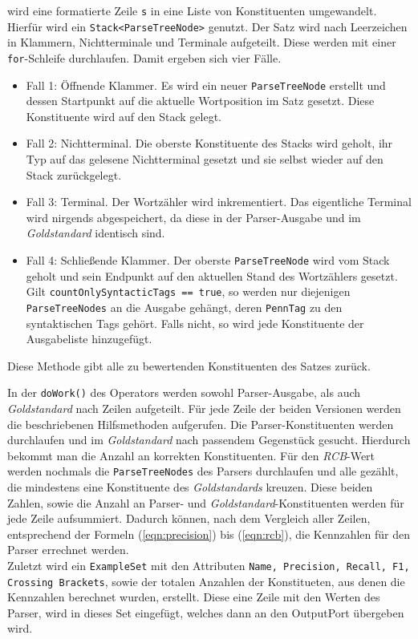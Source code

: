 wird eine formatierte Zeile \texttt{s} in eine Liste von Konstituenten umgewandelt. Hierfür wird ein \texttt{Stack<ParseTreeNode>} genutzt. Der Satz wird nach Leerzeichen in Klammern, Nichtterminale und Terminale aufgeteilt. Diese werden mit einer \texttt{for}-Schleife durchlaufen. Damit ergeben sich vier Fälle. 
\begin{itemize}
\item Fall 1: Öffnende Klammer. Es wird ein neuer \texttt{ParseTreeNode} erstellt und dessen Startpunkt auf die aktuelle Wortposition im Satz gesetzt. Diese Konstituente wird auf den Stack gelegt.
\item Fall 2: Nichtterminal. Die oberste Konstituente des Stacks wird geholt, ihr Typ auf das gelesene Nichtterminal gesetzt und sie selbst wieder auf den Stack zurückgelegt.
\item Fall 3: Terminal. Der Wortzähler wird inkrementiert. Das eigentliche Terminal wird nirgends abgespeichert, da diese in der Parser-Ausgabe und im \textit{Goldstandard} identisch sind. 
\item Fall 4: Schließende Klammer. Der oberste \texttt{ParseTreeNode} wird vom Stack geholt und sein Endpunkt auf den aktuellen Stand des Wortzählers gesetzt. Gilt \texttt{countOnlySyntacticTags == true}, so werden nur diejenigen \texttt{ParseTreeNodes} an die Ausgabe gehängt, deren \texttt{PennTag} zu den syntaktischen Tags gehört. Falls nicht, so wird jede Konstituente der Ausgabeliste hinzugefügt.
\end{itemize}
Diese Methode gibt alle zu bewertenden Konstituenten des Satzes zurück. 

In der \texttt{doWork()} des Operators werden sowohl Parser-Ausgabe, als auch \textit{Goldstandard} nach Zeilen aufgeteilt. Für jede Zeile der beiden Versionen werden die beschriebenen Hilfsmethoden aufgerufen. Die Parser-Konstituenten werden durchlaufen und im \textit{Goldstandard} nach passendem Gegenstück gesucht. Hierdurch bekommt man die Anzahl an korrekten Konstituenten. Für den \textit{RCB}-Wert werden nochmals die \texttt{ParseTreeNodes} des Parsers durchlaufen und alle gezählt, die mindestens eine Konstituente des \textit{Goldstandards} kreuzen. Diese beiden Zahlen, sowie die Anzahl an Parser- und \textit{Goldstandard}-Konstituenten werden für jede Zeile aufsummiert. Dadurch können, nach dem Vergleich aller Zeilen, entsprechend der Formeln (\ref{eqn:precision}) bis (\ref{eqn:rcb}), die Kennzahlen für den Parser errechnet werden. \\
Zuletzt wird ein \texttt{ExampleSet} mit den Attributen \texttt{Name, Precision, Recall, F1, Crossing Brackets}, sowie der totalen Anzahlen der Konstitueten, aus denen die Kennzahlen berechnet wurden, erstellt. Diese eine Zeile mit den Werten des Parser, wird in dieses Set eingefügt, welches dann an den OutputPort übergeben wird. 

